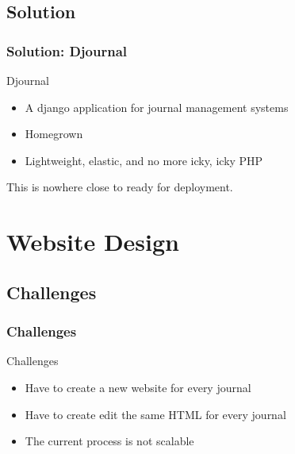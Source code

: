 \documentclass[aspectratio=169,9pt,xcolor=dvipsnames]{beamer}
\begin{document}
\subsection{Solution}
\begin{frame}
    \frametitle{Solution: Djournal}
    \begin{center}
        \begin{block}{Djournal}
            \begin{itemize}
                \item A django application for journal management systems
                \item Homegrown
                \item Lightweight, elastic, and no more icky, icky PHP
            \end{itemize}
        \end{block}
    This is nowhere close to ready for deployment.
    \end{center}
    
\end{frame}


\section*{Website Design}
\subsection{Challenges}
\begin{frame}
    \frametitle{Challenges}
    \begin{center}
    \end{center}
    \begin{block}{Challenges}
        \begin{itemize}
            \item Have to create a new website for every journal
            \item Have to create edit the same HTML for every journal
            \item The current process is not scalable
        \end{itemize}
    \end{block}
\end{frame}
\end{document}

